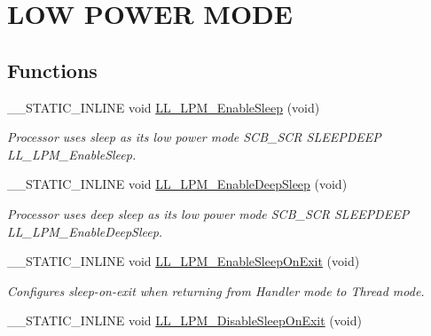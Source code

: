 \hypertarget{group___c_o_r_t_e_x___l_l___e_f___l_o_w___p_o_w_e_r___m_o_d_e}{}\section{L\+OW P\+O\+W\+ER M\+O\+DE}
\label{group___c_o_r_t_e_x___l_l___e_f___l_o_w___p_o_w_e_r___m_o_d_e}
\subsection*{Functions}
\begin{DoxyCompactItemize}
\item 
\+\_\+\+\_\+\+S\+T\+A\+T\+I\+C\+\_\+\+I\+N\+L\+I\+NE void \hyperlink{group___c_o_r_t_e_x___l_l___e_f___l_o_w___p_o_w_e_r___m_o_d_e_gab55eabc37e5abe00df558c0ba1c37508}{L\+L\+\_\+\+L\+P\+M\+\_\+\+Enable\+Sleep} (void)
\begin{DoxyCompactList}\small\item\em Processor uses sleep as its low power mode  S\+C\+B\+\_\+\+S\+CR S\+L\+E\+E\+P\+D\+E\+EP L\+L\+\_\+\+L\+P\+M\+\_\+\+Enable\+Sleep. \end{DoxyCompactList}\item 
\+\_\+\+\_\+\+S\+T\+A\+T\+I\+C\+\_\+\+I\+N\+L\+I\+NE void \hyperlink{group___c_o_r_t_e_x___l_l___e_f___l_o_w___p_o_w_e_r___m_o_d_e_ga37d70238e98ca1214e3fe4113b119474}{L\+L\+\_\+\+L\+P\+M\+\_\+\+Enable\+Deep\+Sleep} (void)
\begin{DoxyCompactList}\small\item\em Processor uses deep sleep as its low power mode  S\+C\+B\+\_\+\+S\+CR S\+L\+E\+E\+P\+D\+E\+EP L\+L\+\_\+\+L\+P\+M\+\_\+\+Enable\+Deep\+Sleep. \end{DoxyCompactList}\item 
\+\_\+\+\_\+\+S\+T\+A\+T\+I\+C\+\_\+\+I\+N\+L\+I\+NE void \hyperlink{group___c_o_r_t_e_x___l_l___e_f___l_o_w___p_o_w_e_r___m_o_d_e_gabb2b2648dff19d88209af8761fc34c30}{L\+L\+\_\+\+L\+P\+M\+\_\+\+Enable\+Sleep\+On\+Exit} (void)
\begin{DoxyCompactList}\small\item\em Configures sleep-\/on-\/exit when returning from Handler mode to Thread mode. \end{DoxyCompactList}\item 
\+\_\+\+\_\+\+S\+T\+A\+T\+I\+C\+\_\+\+I\+N\+L\+I\+NE void \hyperlink{group___c_o_r_t_e_x___l_l___e_f___l_o_w___p_o_w_e_r___m_o_d_e_ga88768c6c5f53de30a647123241451eb9}{L\+L\+\_\+\+L\+P\+M\+\_\+\+Disable\+Sleep\+On\+Exit} (void)

\end{DoxyCompactItemize}
